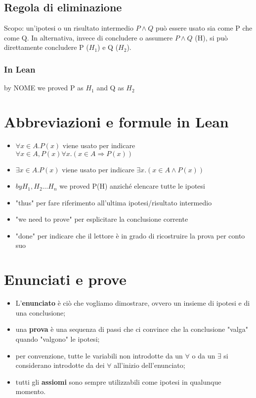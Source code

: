 \documentclass[12pt]{article}
\begin{document}
\subsection{Regola di eliminazione}
Scopo: un'ipotesi o un risultato intermedio $P \wedge Q$ può essere usato sia come P che come Q. In alternativa, invece di concludere o assumere $P \wedge Q$ (H), si può direttamente concludere P ($H_1$) e Q ($H_2$).
\subsubsection{In Lean}
\begin{center}
    by NOME we proved P as $H_1$ and Q as $H_2$
\end{center}
\section{Abbreviazioni e formule in Lean}
\begin{itemize}
    \item $\forall x \in A.P(x)$ viene usato per indicare $\forall x \in A, P(x) \forall x. (x \in A \Rightarrow P(x))$
    \item $\exists x \in A.P(x)$ viene usato per indicare $\exists x. (x \in A \wedge P(x))$
    \item $by H_1, H_2 \dots H_n$ we proved P(H) anziché elencare tutte le ipotesi
    \item "thus" per fare riferimento all'ultima ipotesi/risultato intermedio
    \item "we need to prove" per esplicitare la conclusione corrente
    \item "done" per indicare che il lettore è in grado di ricostruire la prova per conto suo 
\end{itemize}
\pagebreak
\section{Enunciati e prove}
\begin{itemize}
    \item L'\textbf{enunciato} è ciò che vogliamo dimostrare, ovvero un insieme di ipotesi e di una conclusione;
    \item una \textbf{prova} è una sequenza di passi che ci convince che la conclusione "valga" quando "valgono" le ipotesi;
    \item per convenzione, tutte le variabili non introdotte da un $\forall$ o da un $\exists$ si considerano introdotte da dei $\forall$ all'inizio dell'enunciato;
    \item tutti gli \textbf{assiomi} sono sempre utilizzabili come ipotesi in qualunque momento.
\end{itemize}
\end{document}
